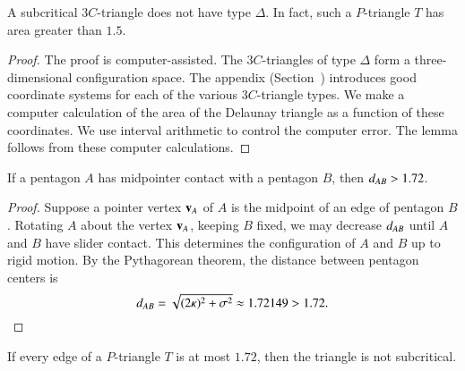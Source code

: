 \begin{lemma} 
  A subcritical $3C$-triangle does not have type $\Delta$.  In fact,
  such a $P$-triangle $T$ has area greater than $1.5$.
\end{lemma}

\begin{proof} The proof is computer-assisted.  The $3C$-triangles of
  type $\Delta$ form a three-dimensional configuration space.  The
  appendix (Section~) introduces good coordinate
  systems for each of the various $3C$-triangle types.  We make a
  computer calculation of the area of the Delaunay triangle as a
  function of these coordinates.  We use interval arithmetic to
  control the computer error.  The lemma follows from these computer
  calculations.
\end{proof}



\begin{lemma}  
  If a pentagon $A$ has midpointer contact with a pentagon $B$, then
  $d_{AB} > 1.72$.
\end{lemma}

\begin{proof} Suppose a pointer vertex ${\mathbf v}_A$ of $A$ is the midpoint of an
  edge of pentagon $B$.  Rotating $A$ about the vertex ${\mathbf v}_A$, keeping
  $B$ fixed, we may decrease $d_{AB}$ until $A$ and $B$
  have slider contact.  This determines the configuration of $A$ and
  $B$ up to rigid motion.  By the Pythagorean theorem, the
  distance between pentagon centers is
\[
d_{AB} = \sqrt{(2\kappa)^2 + \sigma^2} \approx 1.72149 > 1.72.
\] %
\end{proof}

\begin{lemma}
  If every edge of a $P$-triangle $T$ is at most $1.72$, then the
  triangle is not subcritical.
\end{lemma}

